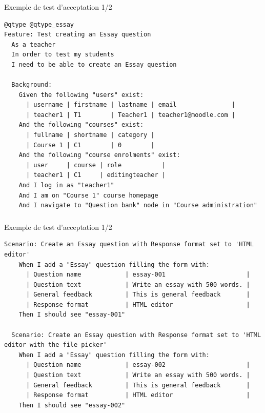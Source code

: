 \documentclass{beamer}
\begin{document}
  \begin{frame}[fragile]
    \frametitle{\insertsection}
    \alert{Exemple de test d'acceptation 1/2}
\begin{lstlisting}[language=behat,frame=l]
@qtype @qtype_essay
Feature: Test creating an Essay question
  As a teacher
  In order to test my students
  I need to be able to create an Essay question

  Background:
    Given the following "users" exist:
      | username | firstname | lastname | email               |
      | teacher1 | T1        | Teacher1 | teacher1@moodle.com |
    And the following "courses" exist:
      | fullname | shortname | category |
      | Course 1 | C1        | 0        |
    And the following "course enrolments" exist:
      | user     | course | role           |
      | teacher1 | C1     | editingteacher |
    And I log in as "teacher1"
    And I am on "Course 1" course homepage
    And I navigate to "Question bank" node in "Course administration"
\end{lstlisting}
\end{frame}
  \begin{frame}[fragile]
    \frametitle{\insertsection}
    \alert{Exemple de test d'acceptation 1/2}
\begin{lstlisting}[language=behat,frame=l]
  Scenario: Create an Essay question with Response format set to 'HTML editor'
    When I add a "Essay" question filling the form with:
      | Question name            | essay-001                      |
      | Question text            | Write an essay with 500 words. |
      | General feedback         | This is general feedback       |
      | Response format          | HTML editor                    |
    Then I should see "essay-001"

  Scenario: Create an Essay question with Response format set to 'HTML editor with the file picker'
    When I add a "Essay" question filling the form with:
      | Question name            | essay-002                      |
      | Question text            | Write an essay with 500 words. |
      | General feedback         | This is general feedback       |
      | Response format          | HTML editor                    |
    Then I should see "essay-002"
\end{lstlisting}
\end{frame}
  
\end{document}
